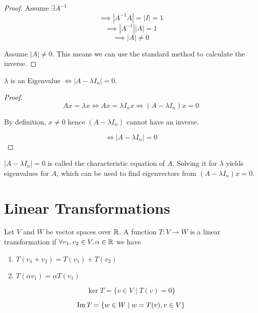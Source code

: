 \documentclass[a4paper,10pt]{article}
\begin{document}
\begin{proof}
	Assume $\exists A^{-1}$
	\[ \implies |A^{-1}A| = |I| = 1 \]
	\[ \implies |A^{-1}||A| = 1 \]
	\[ \implies |A| \neq 0 \]

	Assume $|A| \neq 0$. This means we can use the standard method
	to calculate the inverse.
\end{proof}

\begin{lemma}
	$\lambda$ is an Eigenvalue $\iff |A - \lambda I_n| = 0$.
\end{lemma}

\begin{proof}
	\[ Ax = \lambda x \iff Ax = \lambda I_n x \iff (A - \lambda I_n)x = 0 \]

	By definition, $x \neq 0$ hence $(A - \lambda I_n)$ cannot have an inverse.

	\[ \iff |A - \lambda I_n| = 0 \]
\end{proof}

\begin{defn}
	$|A - \lambda I_n| = 0$ is called the characteristic equation of
	$A$. Solving it for $\lambda$ yields eigenvalues for $A$, which
	can be used to find eigenvectors from $(A - \lambda I_n)x = 0$.
\end{defn}

\section{Linear Transformations}

\begin{defn}
	Let $V$ and $W$ be vector spaces over $\mathbb{R}$. A function $T:V \to
	W$ is a linear transformation if $\forall v_1, v_2 \in V, \alpha
	\in \mathbb{R}$ we have
	\begin{enumerate}
		\item
			$T(v_1 + v_2) = T(v_1) + T(v_2)$
		\item
			$T(\alpha v_1) = \alpha T(v_1)$
	\end{enumerate}
\end{defn}

\begin{defn}[Kernel]
	\[ \ker T = \{ v \in V \mid T(v) = 0 \} \]
\end{defn}

\begin{defn}
	\[ \operatorname{Im} T = \{ w \in W \mid w = T(v), v \in V \} \]
\end{defn}
\end{document}
